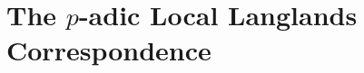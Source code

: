 \chapter{The \texorpdfstring{$p$}{}-adic Local Langlands Correspondence}
    \begin{abstract}
            
    \end{abstract}
    
    \minitoc